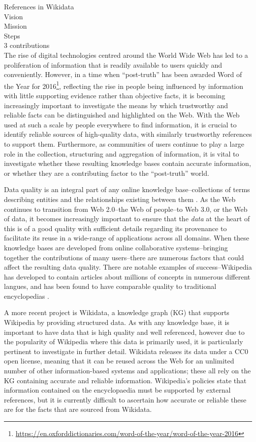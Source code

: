 \documentclass{llncs}
\begin{document}
References in Wikidata\\
Vision\\
Mission\\
Steps\\
3 contributions\\


The rise of digital technologies centred around the World Wide Web has led to a proliferation of information that is readily available to users quickly and conveniently. However, in a time when ``post-truth'' has been awarded Word of the Year for 2016\footnote{\url{https://en.oxforddictionaries.com/word-of-the-year/word-of-the-year-2016}}, reflecting the rise in people being influenced by information with little supporting evidence rather than objective facts, it is becoming increasingly important to investigate the means by which trustworthy and reliable facts can be distinguished and highlighted on the Web. With the Web used at such a scale by people everywhere to find information, it is crucial to identify reliable sources of high-quality data, with similarly trustworthy references to support them. Furthermore, as communities of users continue to play a large role in the collection, structuring and aggregation of information, it is vital to investigate whether these resulting knowledge bases contain accurate information, or whether they are a contributing factor to the ``post-truth'' world. 

Data quality is an integral part of any online knowledge base--collections of terms describing entities and the relationships existing between them \cite{DBLP:series/ihis/2009hoo}. As the Web continues to transition from Web 2.0--the Web of people--to Web 3.0, or the Web of data, it becomes increasingly important to ensure that the \emph{data} at the heart of this is of a good quality with sufficient details regarding its provenance to facilitate its reuse in a wide-range of applications across all domains. When these knowledge bases are developed from online collaborative systems--bringing together the contributions of many users--there are numerous factors that could affect the resulting data quality. There are notable examples of success--Wikipedia has developed to contain articles about millions of concepts in numerous different langues, and has been found to have comparable quality to traditional encyclopedias \cite{giles2005internet}.

A more recent project is Wikidata, a knowledge graph (KG) that supports Wikipedia by providing structured data. As with any knowledge base, it is important to have data that is high quality and well referenced, however due to the popularity of Wikipedia where this data is primarily used, it is particularly pertinent to investigate in further detail. Wikidata releases its data under a CC0 open license, meaning that it can be reused across the Web for an unlimited number of other information-based systems and applications; these all rely on the KG containing accurate and reliable information. Wikipedia's policies state that information contained on the encyclopaedia must be supported by external references, but it is currently difficult to ascertain how accurate or reliable these are for the facts that are sourced from Wikidata. 
\end{document}
